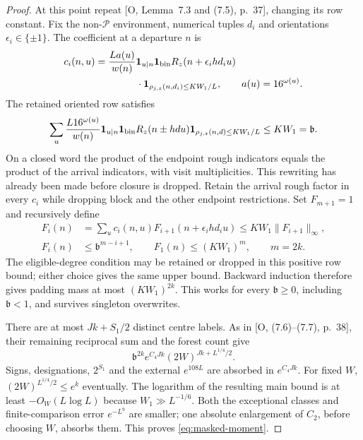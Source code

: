 \documentclass[11pt]{article}
\theoremstyle{definition}
\newcommand{\ind}{\mathbf 1}
\newcommand{\Pset}{\mathcal P}
\theoremstyle{remark}
\numberwithin{equation}{section}
\begin{document}
\begin{proof}
At this point repeat [O, Lemma~7.3 and (7.5), p.~37], changing its row constant.
Fix the non-$\Pset$ environment, numerical tuples $d_i$ and orientations $\epsilon_i\in\{\pm1\}$.
The coefficient at a departure $n$ is
\begin{equation}\label{eq:rough-recursion-coefficients}
\begin{aligned}
 c_i(n,u)={}&\frac{L a(u)}{w(n)}\ind_{u\mid n}\ind_{\rm bin}
 R_z(n+\epsilon_i h d_i u)\\
 &\hspace{1cm}\cdot\ind_{\rho_{j,z}(n,d_i)\le KW_1/L},\qquad a(u)=16^{\omega(u)}.
\end{aligned}
\end{equation}
The retained oriented row satisfies
\begin{equation}\label{eq:density-row}
 \sum_u\frac{L16^{\omega(u)}}{w(n)}\ind_{u\mid n}\ind_{\rm bin}
 R_z(n\pm hdu)\ind_{\rho_{j,z}(n,d)\le KW_1/L}\le KW_1=\mathfrak b.
\end{equation}
On a closed word the product of the endpoint rough indicators equals the product of the arrival indicators,
with visit multiplicities. This rewriting has already been made before closure is dropped.
Retain the arrival rough factor in every $c_i$ while dropping block and the other endpoint restrictions.
Set $F_{m+1}=1$ and recursively define
\begin{equation}\label{eq:rough-padding-recursion}
\begin{aligned}
 F_i(n)&=\sum_u c_i(n,u)F_{i+1}(n+\epsilon_i h d_i u)
 \le KW_1\|F_{i+1}\|_\infty,\\
 F_i(n)&\le\mathfrak b^{m-i+1},\qquad
 F_1(n)\le(KW_1)^m,\qquad m=2k.
\end{aligned}
\end{equation}
The eligible-degree condition may be retained or dropped in this positive row bound; either choice gives the
same upper bound. Backward induction therefore gives padding mass at most $(KW_1)^{2k}$.
This works for every $\mathfrak b\ge0$, including $\mathfrak b<1$, and survives singleton overwrites.

There are at most $Jk+S_1/2$ distinct centre labels. As in [O, (7.6)--(7.7), p.~38], their remaining reciprocal
sum and the forest count give
\begin{equation}\label{eq:moment-completion}
 \mathfrak b^{2k}e^{C_4Jk}(2W)^{Jk+L^{1/4}/2}.
\end{equation}
Signs, designations, $2^{S_1}$ and the external $e^{108L}$ are absorbed in $e^{C_4Jk}$.
For fixed $W$, $(2W)^{L^{1/4}/2}\le e^k$ eventually.
The logarithm of the resulting main bound is at least $-O_W(L\log L)$ because $W_1\gg L^{-1/6}$.
Both the exceptional classes and finite-comparison error $e^{-L^9}$ are smaller; one absolute enlargement of
$C_2$, before choosing $W$, absorbs them. This proves \eqref{eq:masked-moment}.


\end{proof}
\end{document}
